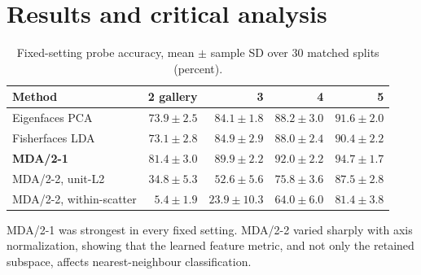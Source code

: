 \documentclass{article}
\begin{document}
\section{Results and critical analysis}
\begin{table}[H]
\centering
\small
\caption{Fixed-setting probe accuracy, mean $\pm$ sample SD over 30 matched splits (percent).}
\label{tab:fixed}
\begin{tabular}{lrrrr}
\toprule
Method & 2 gallery & 3 & 4 & 5\\
\midrule
Eigenfaces PCA & $73.9\pm2.5$ & $84.1\pm1.8$ & $88.2\pm3.0$ & $91.6\pm2.0$\\
Fisherfaces LDA & $73.1\pm2.8$ & $84.9\pm2.9$ & $88.0\pm2.4$ & $90.4\pm2.2$\\
\textbf{MDA/2-1} & $\mathbf{81.4\pm3.0}$ & $\mathbf{89.9\pm2.2}$ & $\mathbf{92.0\pm2.2}$ & $\mathbf{94.7\pm1.7}$\\
MDA/2-2, unit-L2 & $34.8\pm5.3$ & $52.6\pm5.6$ & $75.8\pm3.6$ & $87.5\pm2.8$\\
MDA/2-2, within-scatter & $5.4\pm1.9$ & $23.9\pm10.3$ & $64.0\pm6.0$ & $81.4\pm3.8$\\
\bottomrule
\end{tabular}
\end{table}

MDA/2-1 was strongest in every fixed setting. MDA/2-2 varied sharply with axis normalization, showing that the learned feature metric, and not only the retained subspace, affects nearest-neighbour classification.
\end{document}
